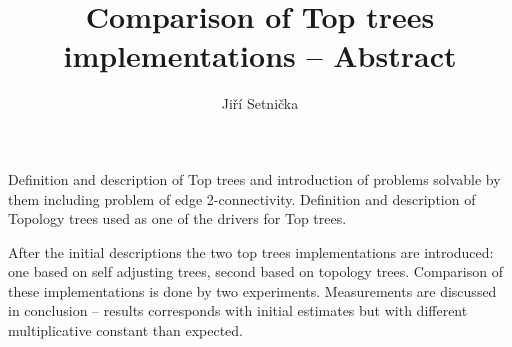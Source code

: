 \documentclass{article}
\author{Jiří Setnička}
\title{Comparison of Top trees implementations -- Abstract}
\date{}
\begin{document}
\maketitle

Definition and description of Top trees and introduction of problems solvable by
them including problem of edge 2-connectivity. Definition and description of
Topology trees used as one of the drivers for Top trees.

After the initial descriptions the two top trees implementations are introduced:
one based on self adjusting trees, second based on topology trees.
Comparison of these implementations is done by two experiments. Measurements
are discussed in conclusion -- results corresponds with initial estimates but
with different multiplicative constant than expected.
\end{document}

